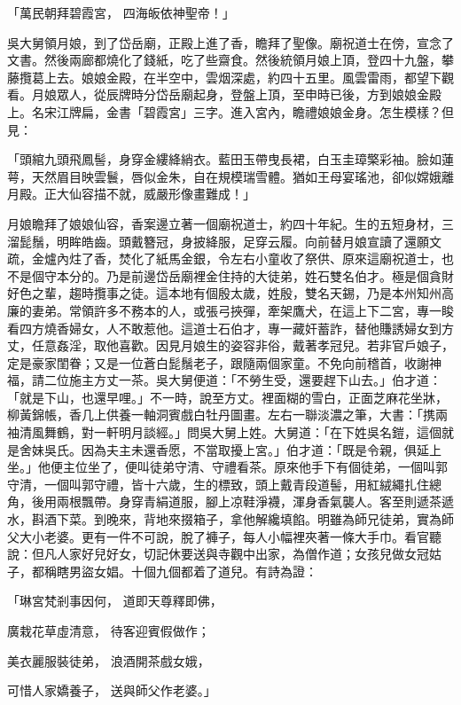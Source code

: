 「萬民朝拜碧霞宮，  四海皈依神聖帝！」

吳大舅領月娘，到了岱岳廟，正殿上進了香，瞻拜了聖像。廟祝道士在傍，宣念了文書。然後兩廊都燒化了錢紙，吃了些齋食。然後統領月娘上頂，登四十九盤，攀藤攬葛上去。娘娘金殿，在半空中，雲烟深處，約四十五里。風雲雷雨，都望下觀看。月娘眾人，從辰牌時分岱岳廟起身，登盤上頂，至申時已後，方到娘娘金殿上。名宋江牌扁，金書「碧霞宮」三字。進入宮內，瞻禮娘娘金身。怎生模樣？但見：

「頭綰九頭飛鳳髻，身穿金縷絳綃衣。藍田玉帶曳長裙，白玉圭璋檠彩袖。臉如蓮萼，天然眉目映雲鬟，唇似金朱，自在規模瑞雪體。猶如王母宴瑤池，卻似嫦娥離月殿。正大仙容描不就，威嚴形像畫難成！」

月娘瞻拜了娘娘仙容，香案邊立著一個廟祝道士，約四十年紀。生的五短身材，三溜髭鬚，明眸皓齒。頭戴簪冠，身披絳服，足穿云履。向前替月娘宣讀了還願文疏，金爐內炷了香，焚化了紙馬金銀，令左右小童收了祭供、原來這廟祝道士，也不是個守本分的。乃是前邊岱岳廟裡金住持的大徒弟，姓石雙名伯才。極是個貪財好色之輩，趨時攬事之徒。這本地有個殷太歲，姓殷，雙名天錫，乃是本州知州高廉的妻弟。常領許多不務本的人，或張弓挾彈，牽架鷹犬，在這上下二宮，專一睃看四方燒香婦女，人不敢惹他。這道士石伯才，專一藏奸蓄詐，替他賺誘婦女到方丈，任意姦淫，取他喜歡。因見月娘生的姿容非俗，戴著孝冠兒。若非官戶娘子，定是豪家閨眷；又是一位蒼白髭鬚老子，跟隨兩個家童。不免向前稽首，收謝神福，請二位施主方丈一茶。吳大舅便道：「不勞生受，還要趕下山去。」伯才道：「就是下山，也還早哩。」不一時，說至方丈。裡面糊的雪白，正面芝麻花坐牀，柳黃錦帳，香几上供養一軸洞賓戲白牡丹圖畫。左右一聯淡濃之筆，大書：「携兩袖清風舞鶴，對一軒明月談經。」問吳大舅上姓。大舅道：「在下姓吳名鎧，這個就是舍妹吳氏。因為夫主未還香愿，不當取擾上宮。」伯才道：「既是令親，俱延上坐。」他便主位坐了，便叫徒弟守清、守禮看茶。原來他手下有個徒弟，一個叫郭守清，一個叫郭守禮，皆十六歲，生的標致，頭上戴青段道髻，用紅絨繩扎住總角，後用兩根飄帶。身穿青絹道服，腳上凉鞋淨襪，渾身香氣襲人。客至則遞茶遞水，斟酒下菜。到晚來，背地來掇箱子，拿他解纔填餡。明雖為師兄徒弟，實為師父大小老婆。更有一件不可說，脫了褲子，每人小幅裡夾著一條大手巾。看官聽說：但凡人家好兒好女，切記休要送與寺觀中出家，為僧作道；女孩兒做女冠姑子，都稱瞎男盜女娼。十個九個都着了道兒。有詩為證：

「琳宮梵剎事因何，  道即天尊釋即佛，

廣栽花草虛清意，  待客迎賓假做作；

美衣麗服裝徒弟，  浪酒開茶戲女娥，

可惜人家嬌養子，  送與師父作老婆。」

